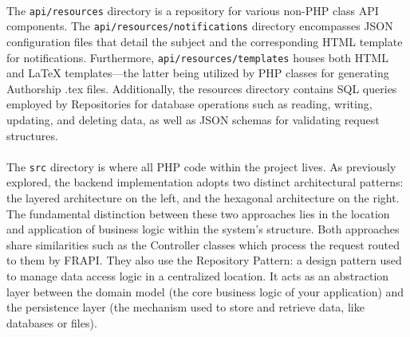 \paragraph{} The \verb|api/resources| directory is a repository for various non-PHP class API components. The \verb|api/resources/notifications| directory encompasses JSON configuration files that detail the subject and the corresponding HTML template for notifications. Furthermore, \verb|api/resources/templates| houses both HTML and LaTeX templates—the latter being utilized by PHP classes for generating Authorship .tex files. Additionally, the resources directory contains SQL queries employed by Repositories for database operations such as reading, writing, updating, and deleting data, as well as JSON schemas for validating request structures.

\paragraph{} The \verb|src| directory is where all PHP code within the project lives. As previously explored, the backend implementation adopts two distinct architectural patterns: the layered architecture on the left, and the hexagonal architecture on the right. The fundamental distinction between these two approaches lies in the location and application of business logic within the system's structure. Both approaches share similarities such as the Controller classes which process the request routed to them by FRAPI. They also use the Repository Pattern: a design pattern used to manage data access logic in a centralized location. It acts as an abstraction layer between the domain model (the core business logic of your application) and the persistence layer (the mechanism used to store and retrieve data, like databases or files).

\paragraph{}

\begin{minipage}{.5\textwidth}
\end{minipage}%
\begin{minipage}{.5\textwidth}

\end{minipage}


